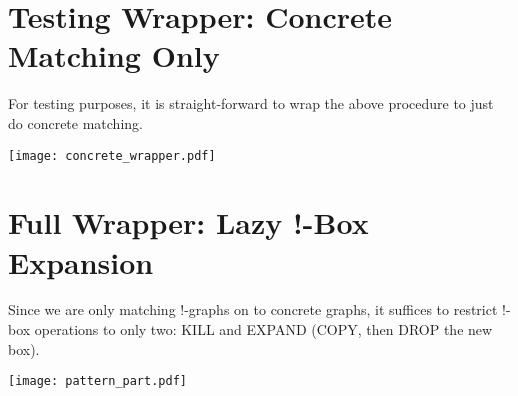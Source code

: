 \documentclass{article}
\begin{document}
\section{Testing Wrapper: Concrete Matching Only}

For testing purposes, it is straight-forward to wrap the above procedure to just do concrete matching.

\begin{center}
  \texttt{[image: concrete\_wrapper.pdf]}
\end{center}

\section{Full Wrapper: Lazy !-Box Expansion}

Since we are only matching !-graphs on to concrete graphs, it suffices to restrict !-box operations to only two: KILL and EXPAND (COPY, then DROP the new box).

\begin{center}
  \texttt{[image: pattern\_part.pdf]}
\end{center}
\end{document}
